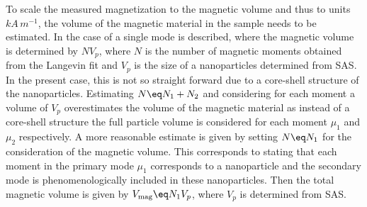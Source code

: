 \documentclass[\main/dresen_thesis.tex]{subfiles}
\begin{document}
    To scale the measured magnetization to the magnetic volume and thus to units $\unit{kA \, m^{-1}}$, the volume of the magnetic material in the sample needs to be estimated.
    In  the case of a single mode is described, where the magnetic volume is determined by $N V_p$, where $N$ is the number of magnetic moments obtained from the Langevin fit and $V_p$ is the size of a nanoparticles determined from SAS.
    In the present case, this is not so straight forward due to a core-shell structure of the nanoparticles.
    Estimating $N \eq N_1 + N_2$ and considering for each moment a volume of $V_p$ overestimates the volume of the magnetic material as instead of a core-shell structure the full particle volume is considered for each moment $\mu_1$ and $\mu_2$ respectively.
    A more reasonable estimate is given by setting $N \eq N_1$ for the consideration of the magnetic volume.
    This corresponds to stating that each moment in the primary mode $\mu_1$ corresponds to a nanoparticle and the secondary mode is phenomenologically included in these nanoparticles.
    Then the total magnetic volume is given by $V_\mathrm{mag} \eq N_1 V_p$, where $V_p$ is determined from SAS.
\end{document}
